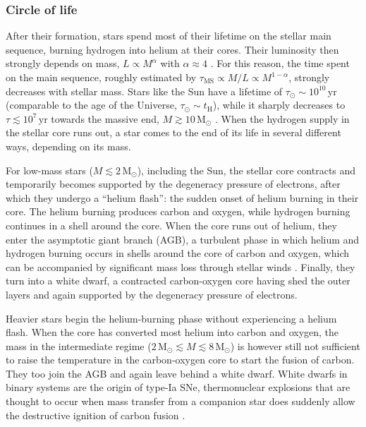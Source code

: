 \subsubsection{Circle of life}
\label{chIsssec:Circle_of_life}

After their formation, stars spend most of their lifetime on the stellar main sequence, burning hydrogen into helium at their cores. Their luminosity then strongly depends on mass, $L \propto M^\alpha$ with $\alpha \approx 4$ \citep[e.g.][]{1993A&AS..100..647B}. For this reason, the time spent on the main sequence, roughly estimated by $\tau_\text{MS} \propto M/L \propto M^{1-\alpha}$, strongly decreases with stellar mass. Stars like the Sun have a lifetime of $\tau_\odot \sim 10^{10} \, \mathrm{yr}$ (comparable to the age of the Universe, $\tau_\odot \sim t_\text{H}$), while it sharply decreases to $\tau \lesssim 10^7 \, \mathrm{yr}$ towards the massive end, $M \gtrsim 10 \, \mathrm{M_\odot}$ \citep{1992A&AS...96..269S}. When the hydrogen supply in the stellar core runs out, a star comes to the end of its life in several different ways, depending on its mass.

For low-mass stars ($M \lesssim 2 \, \mathrm{M_\odot}$), including the Sun, the stellar core contracts and temporarily becomes supported by the degeneracy pressure of electrons, after which they undergo a ``helium flash'': the sudden onset of helium burning in their core. The helium burning produces carbon and oxygen, while hydrogen burning continues in a shell around the core. When the core runs out of helium, they enter the asymptotic giant branch (AGB), a turbulent phase in which helium and hydrogen burning occurs in shells around the core of carbon and oxygen, which can be accompanied by significant mass loss through stellar winds \citep{2010gfe..book.....M}. Finally, they turn into a white dwarf, a contracted carbon-oxygen core having shed the outer layers and again supported by the degeneracy pressure of electrons.

Heavier stars begin the helium-burning phase without experiencing a helium flash. When the core has converted most helium into carbon and oxygen, the mass in the intermediate regime ($2 \, \mathrm{M_\odot} \lesssim M \lesssim 8 \, \mathrm{M_\odot}$) is however still not sufficient to raise the temperature in the carbon-oxygen core to start the fusion of carbon. They too join the AGB and again leave behind a white dwarf. White dwarfs in binary systems are the origin of type-Ia SNe, thermonuclear explosions that are thought to occur when mass transfer from a companion star does suddenly allow the destructive ignition of carbon fusion \citep[;  hereafter]{2019A&ARv..27....3M}.

